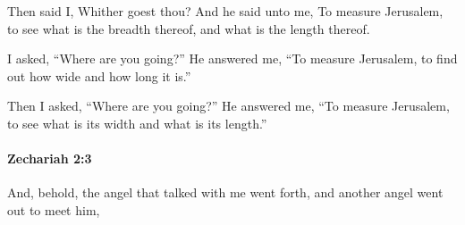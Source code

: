 			\begin{versebox}
					\item[BHS] 
					\item[LXX] 
					\item[ASV] Then said I, Whither goest thou? And he said unto me, To measure Jerusalem, to see what is the breadth thereof, and what is the length thereof.
					\item[NIV] I asked, “Where are you going?” He answered me, “To measure Jerusalem, to find out how wide and how long it is.”
					\item[NRSV] Then I asked, “Where are you going?” He answered me, “To measure Jerusalem, to see what is its width and what is its length.”
			\end{versebox}

		\paragraph{Zechariah 2:3} %
			\label{ZECHARIAH-2-3}

			And, behold, the angel that talked with me went forth, and another angel went out to meet him,

